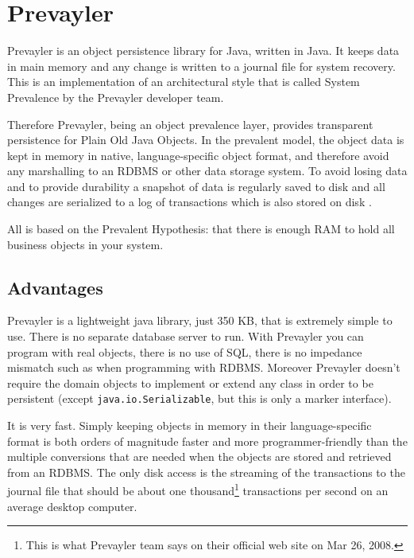 		\section{Prevayler}		
		Prevayler is an object persistence library for Java, written in Java. 
		It keeps data in main memory and any change is written to a journal file for system recovery. This is 
		an implementation of an architectural style that is called System Prevalence by the 
		Prevayler developer team. 
		
		Therefore Prevayler, being an object prevalence layer, provides transparent persistence for 
		Plain Old Java Objects. In the prevalent model, the object data is kept in memory in native, language-specific 
		object format, and therefore avoid any marshalling to an RDBMS or other data storage system. 
		To avoid losing data and to provide durability a snapshot of data is regularly saved to disk and all changes 
		are serialized to a log of transactions which is also stored on disk \cite{Wuestefeld}.
		
		All is based on the Prevalent Hypothesis: that there is enough RAM to hold all business objects in your system. 	
		
			\subsection{Advantages}
			Prevayler is a lightweight java library, just 350 KB, that is extremely simple to use. There is no separate 
			database server to run. With Prevayler you can program with real objects, there is no use of SQL, there is 
			no impedance mismatch such as when programming with RDBMS. Moreover Prevayler doesn't require the 
			domain objects to implement or extend any class in order to be persistent (except \lstinline!java.io.Serializable!, but 
			this is only a marker interface).
			
			It is very fast. Simply keeping objects in memory in their language-specific format is both orders of magnitude 
			faster and more programmer-friendly than the multiple conversions that are needed when the objects are stored 
			and retrieved from an RDBMS. The only disk access is the streaming of the transactions to the journal file that 
			should be about one thousand\footnote{This is what Prevayler team says on their official web site on 
			Mar 26, 2008.} transactions per second on an average desktop computer.
			
